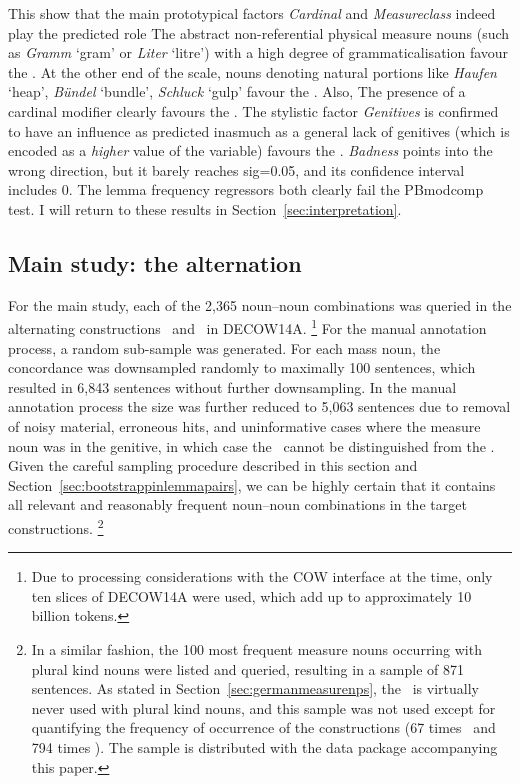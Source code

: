 This show that the main prototypical factors \textit{Cardinal} and \textit{Measureclass} indeed play the predicted role
The abstract non-referential physical measure nouns (such as \textit{Gramm} `gram' or \textit{Liter} `litre') with a high degree of grammaticalisation favour the \NACb.
At the other end of the scale, nouns denoting natural portions like \textit{Haufen} `heap', \textit{Bündel} `bundle', \textit{Schluck} `gulp' favour the \PGCd.
Also, The presence of a cardinal modifier clearly favours the \NACb.
The stylistic factor \textit{Genitives} is confirmed to have an influence as predicted inasmuch as a general lack of genitives (which is encoded as a \textit{higher} value of the variable) favours the \NACb.
\textit{Badness} points into the wrong direction, but it barely reaches sig=0.05, and its confidence interval includes 0.
The lemma frequency regressors both clearly fail the PBmodcomp test.
I will return to these results in Section~\ref{sec:interpretation}.

\subsection{Main study: the alternation}
\label{sec:annotation}
\label{sec:corpushierarchicalmodel}

For the main study, each of the 2,365 noun–noun combinations was queried in the alternating constructions \PGCa\ and \NACa\ in DECOW14A.%
\footnote{Due to processing considerations with the COW interface at the time, only ten slices of DECOW14A were used, which add up to approximately 10 billion tokens.}
For the manual annotation process, a random sub-sample was generated.
For each mass noun, the concordance was downsampled randomly to maximally 100 sentences, which resulted in 6,843 sentences without further downsampling.
In the manual annotation process the size was further reduced to 5,063 sentences due to removal of noisy material, erroneous hits, and uninformative cases where the measure noun was in the genitive, in which case the \NACa\ cannot be distinguished from the \PGCa.
Given the careful sampling procedure described in this section and Section~\ref{sec:bootstrappinlemmapairs}, we can be highly certain that it contains all relevant and reasonably frequent noun–noun combinations in the target constructions.%
\footnote{In a similar fashion, the 100 most frequent measure nouns occurring with plural kind nouns were listed and queried, resulting in a sample of 871 sentences.
As stated in Section~\ref{sec:germanmeasurenps}, the \NACa\ is virtually never used with plural kind nouns, and this sample was not used except for quantifying the frequency of occurrence of the constructions (67 times \NACa\ and 794 times \PGCa).
The sample is distributed with the data package accompanying this paper.}

